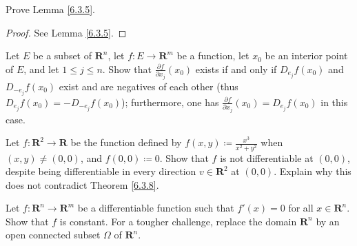 \exercisesection

\begin{exercise}\label{ex 6.3.1}
    Prove Lemma \ref{6.3.5}.
\end{exercise}

\begin{proof}
    See Lemma \ref{6.3.5}.
\end{proof}

\begin{exercise}\label{ex 6.3.2}
    Let \(E\) be a subset of \(\mathbf{R}^n\), let \(f : E \to \mathbf{R}^m\) be a function, let \(x_0\) be an interior point of \(E\), and let \(1 \leq j \leq n\).
    Show that \(\frac{\partial f}{\partial x_j}(x_0)\) exists if and only if \(D_{e_j} f(x_0)\) and \(D_{-e_j} f(x_0)\) exist and are negatives of each other
    (thus \(D_{e_j} f(x_0) = -D_{-e_j} f(x_0)\));
    furthermore, one has \(\frac{\partial f}{\partial x_j}(x_0) = D_{e_j} f(x_0)\) in this case.
\end{exercise}

\begin{exercise}\label{ex 6.3.3}
    Let \(f : \mathbf{R}^2 \to \mathbf{R}\) be the function deﬁned by \(f(x, y) \coloneqq \frac{x^3}{x^2 + y^2}\) when \((x, y) \neq (0, 0)\), and \(f(0, 0) \coloneqq 0\).
    Show that \(f\) is not differentiable at \((0, 0)\), despite being differentiable in every direction \(v \in \mathbf{R}^2\) at \((0, 0)\).
    Explain why this does not contradict Theorem \ref{6.3.8}.
\end{exercise}

\begin{exercise}\label{ex 6.3.4}
    Let \(f : \mathbf{R}^n \to \mathbf{R}^m\) be a differentiable function such that \(f'(x) = 0\) for all \(x \in \mathbf{R}^n\).
    Show that \(f\) is constant.
    For a tougher challenge, replace the domain \(\mathbf{R}^n\) by an open connected subset \(\Omega\) of \(\mathbf{R}^n\).
\end{exercise}
